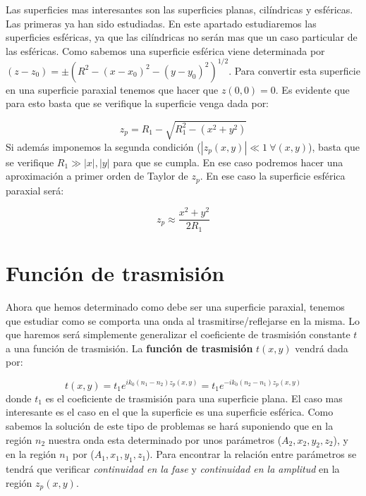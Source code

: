 \documentclass[12pt,a4paper]{book}
\numberwithin{equation}{section}
\numberwithin{figure}{section}
\newcommand{\1}{_{(1)}}
\newcommand{\2}{_{(2)}}
\theoremstyle{definition}
\begin{document}
Las superficies mas interesantes son las superficies planas, cilíndricas y esféricas. Las primeras ya han sido estudiadas. En este apartado estudiaremos las superficies esféricas, ya que las cilíndricas no serán mas que un caso particular de las esféricas. Como sabemos una superficie esférica viene determinada por $(z-z_0) = \pm  (R^2 - (x-x_0)^2 - (y-y_0)^2)^{1/2}$. Para convertir esta superficie en una superficie paraxial tenemos que hacer que $z(0,0)=0$. Es evidente que para esto basta que se verifique la superficie venga dada por:

\begin{equation}
z_{p} = R_1  - \sqrt{R_1^2 - (x^2+y^2)}
\end{equation}
Si además imponemos la segunda condición ($|z_p (x,y) |\ll 1 \ \forall (x,y)$), basta que se verifique $R_1 \gg |x|,|y|$ para que se cumpla. En ese caso podremos hacer una aproximación a primer orden de Taylor de $z_{p}$. En ese caso la superficie esférica paraxial será:

\begin{equation}
z_p \approx \frac{x^2+y^2}{2 R_1}
\end{equation}


\section{Función de trasmisión}

Ahora que hemos determinado como debe ser una superficie paraxial, tenemos que estudiar como se comporta una onda al trasmitirse/reflejarse  en la misma. Lo que haremos será simplemente generalizar el coeficiente de trasmisión constante $t$ a una función de trasmisión. La \textbf{función de trasmisión} $t(x,y)$ vendrá dada por:

\begin{equation}
t(x,y) = t_1 e^{i k_0 (n_1 - n_2) z_p (x,y)} = t_1 e^{-i k_0 (n_2 - n_1) z_p (x,y)} 
\end{equation}
donde $t_1$ es el coeficiente de trasmisión para una superficie plana. El caso mas interesante es el caso en el que la superficie es una superficie esférica. Como sabemos la solución de este tipo de problemas se hará suponiendo que en la región $n_2$ nuestra onda esta determinado por unos parámetros ($A_2,x_2,y_2,z_2$), y en la región $n_1$ por ($A_1,x_1,y_1,z_1$). Para encontrar la relación entre parámetros se tendrá que verificar \textit{continuidad en la fase} y \textit{continuidad en la amplitud} en la región $z_p(x,y)$.  \\
\end{document}
